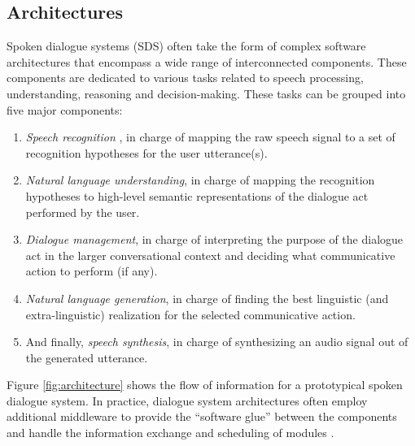  \subsection{Architectures}
\label{sec:architectures}

Spoken dialogue systems (SDS) often take the form of complex software architectures that encompass a wide range of interconnected components. These components are dedicated to various tasks related to speech processing, understanding, reasoning and decision-making. These tasks can be grouped into five major components: 
\begin{enumerate}
\item \textit{Speech recognition} , in charge of mapping the raw speech signal to a set of recognition hypotheses for the user utterance(s).
\item \textit{Natural language understanding}, in charge of mapping the recognition hypotheses to high-level semantic representations of the dialogue act performed by the user.
\item \textit{Dialogue management}, in charge of interpreting the purpose of the dialogue act in the larger conversational context and deciding what communicative action to perform (if any).
\item \textit{Natural language generation}, in charge of finding the best linguistic (and extra-linguistic) realization for the selected communicative action.
\item And finally, \textit{speech synthesis}, in charge of synthesizing an audio signal out of the generated utterance.
 \end{enumerate}

 
 Figure \ref{fig:architecture} shows the flow of information for a prototypical spoken dialogue system. In practice, dialogue system architectures often employ additional middleware to provide the ``software glue'' between the components and handle the information exchange and scheduling of modules \citep{jaspis2004,Herzog:2004,Bohus:2009,schlangen2010}.
   
